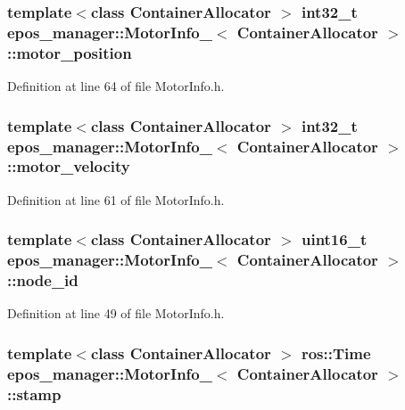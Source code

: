 \subsubsection[{motor\-\_\-position}]{\setlength{\rightskip}{0pt plus 5cm}template$<$class Container\-Allocator $>$ int32\-\_\-t {\bf epos\-\_\-manager\-::\-Motor\-Info\-\_\-}$<$ \-Container\-Allocator $>$\-::{\bf motor\-\_\-position}}\label{structepos__manager_1_1MotorInfo___a307aacb25bd47d3e1e90775e49f46d5e}


\-Definition at line 64 of file \-Motor\-Info.\-h.

\subsubsection[{motor\-\_\-velocity}]{\setlength{\rightskip}{0pt plus 5cm}template$<$class Container\-Allocator $>$ int32\-\_\-t {\bf epos\-\_\-manager\-::\-Motor\-Info\-\_\-}$<$ \-Container\-Allocator $>$\-::{\bf motor\-\_\-velocity}}\label{structepos__manager_1_1MotorInfo___a409cdbc5cbf9b665b3aa0075f4c58031}


\-Definition at line 61 of file \-Motor\-Info.\-h.

\subsubsection[{node\-\_\-id}]{\setlength{\rightskip}{0pt plus 5cm}template$<$class Container\-Allocator $>$ uint16\-\_\-t {\bf epos\-\_\-manager\-::\-Motor\-Info\-\_\-}$<$ \-Container\-Allocator $>$\-::{\bf node\-\_\-id}}\label{structepos__manager_1_1MotorInfo___a19dcb985bf0687564bca4f4fa46443ef}


\-Definition at line 49 of file \-Motor\-Info.\-h.

\subsubsection[{stamp}]{\setlength{\rightskip}{0pt plus 5cm}template$<$class Container\-Allocator $>$ ros\-::\-Time {\bf epos\-\_\-manager\-::\-Motor\-Info\-\_\-}$<$ \-Container\-Allocator $>$\-::{\bf stamp}}\label{structepos__manager_1_1MotorInfo___aebdaebf9ad9c4f1f4212665fd2cff206}


